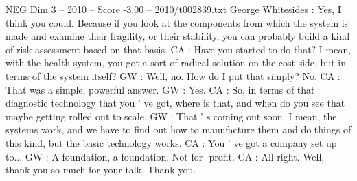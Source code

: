 \begin{textsample}{NEG Dim 3 – 2010 – Score -3.00 – 2010/t002839.txt}
George Whitesides : Yes, I think you could.
Because if you look at the components from which the system is made and examine their fragility, or their stability, you can probably build a kind of risk assessment based on that basis.
CA : Have you started to do that?
I mean, with the health system, you got a sort of radical solution on the cost side, but in terms of the system itself?
GW : Well, no.
How do I put that simply?
No.
CA : That was a simple, powerful answer.
GW : Yes.
CA : So, in terms of that diagnostic technology that you ' ve got, where is that, and when do you see that maybe getting rolled out to scale.
GW : That ' s coming out soon.
I mean, the systems work, and we have to find out how to manufacture them and do things of this kind, but the basic technology works.
CA : You ' ve got a company set up to...
GW : A foundation, a foundation.
Not-for- profit.
CA : All right.
Well, thank you so much for your talk.
Thank you.

\end{textsample}
